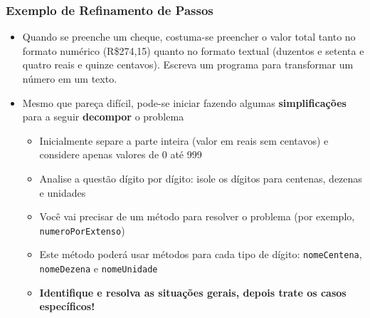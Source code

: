 \documentclass[xcolor={dvipsnames,table},aspectratio=169]{beamer}
\begin{document}
\begin{frame}
\begin{columns}[T]
\begin{column}{0.7\linewidth}
\begin{figure}[h]
\end{figure}
	\end{column}
\end{columns}
\end{frame}

\begin{frame}\frametitle{Exemplo de Refinamento de Passos}
\begin{itemize}
	\item Quando se preenche um cheque, costuma-se preencher o valor total tanto no formato numérico (R\$274,15) quanto no formato textual (duzentos e setenta e quatro reais e quinze centavos). Escreva um programa para transformar um número em um texto.
	\item Mesmo que pareça difícil, pode-se iniciar fazendo algumas \textbf{simplificações} para a seguir \textbf{decompor} o problema
	\begin{itemize}
		\item Inicialmente separe a parte inteira (valor em reais sem centavos) e considere apenas valores de 0 até 999
		\item Analise a questão dígito por dígito: isole os dígitos para centenas, dezenas e unidades
		\item Você vai precisar de um método para resolver o problema (por exemplo, \texttt{numeroPorExtenso})
		\item Este método poderá usar métodos para cada tipo de dígito: \texttt{nomeCentena}, \texttt{nomeDezena} e \texttt{nomeUnidade}
		\item \textbf{Identifique e resolva as situações gerais, depois trate os casos específicos!}
	\end{itemize}
\end{itemize}
\end{frame}
\end{document}
